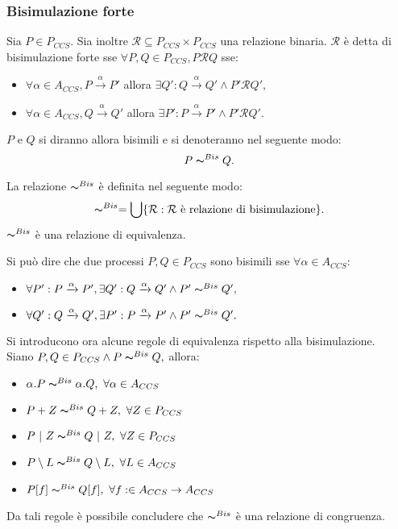\subsubsection{Bisimulazione forte}
\begin{deff}
	Sia $P \in P_{CCS}.$ Sia inoltre $\mathcal{R} \subseteq P_{CCS} \times P_{CCS} $ una relazione binaria. $\mathcal{R}$ \`e detta di bisimulazione forte sse $ \forall P, Q \in P_{CCS}, P\mathcal{R}Q$ sse:
	\begin{itemize}
		\item $ \forall \alpha \in A_{CCS}, P \xrightarrow{\alpha} P'$ allora $\exists Q' : Q \xrightarrow{\alpha} Q' \land P'\mathcal{R}Q',$
		\item $ \forall \alpha \in A_{CCS}, Q \xrightarrow{\alpha} Q'$ allora $\exists P' : P \xrightarrow{\alpha} P' \land P'\mathcal{R}Q'.$
	\end{itemize}
$P$ e $Q$ si diranno allora bisimili e si denoteranno nel seguente modo: $$P \thicksim^{Bis} Q.$$
\end{deff}
\begin{deff}
	La relazione $\thicksim^{Bis}$ \`e definita nel seguente modo: $$ \thicksim^{Bis} = \bigcup \{\mathcal{R}: \mathcal{R} \text{ \`e relazione di bisimulazione} \}.$$ $\thicksim^{Bis} $ \`e una relazione di equivalenza.
\end{deff}
Si pu\`o dire che due processi $P, Q \in P_{CCS} $ sono bisimili sse $\forall \alpha \in A_{CCS}:$
\begin{itemize}
	\item $\forall P': P \xrightarrow{\alpha}P', \exists Q': Q \xrightarrow{\alpha} Q' \land P' \thicksim^{Bis} Q',$
	\item $\forall Q': Q \xrightarrow{\alpha}Q', \exists P': P \xrightarrow{\alpha} P' \land P' \thicksim^{Bis} Q'.$
\end{itemize}
Si introducono ora alcune regole di equivalenza rispetto alla bisimulazione. \\
Siano $P, Q \in P_{CCS} \land P \thicksim^{Bis} Q,$ allora:
\begin{itemize}
	\item $\alpha.P \thicksim^{Bis} \alpha.Q,\ \forall \alpha \in A_{CCS}$
	\item $P + Z \thicksim^{Bis} Q + Z,\ \forall Z \in P_{CCS}$
	\item $P\ |\ Z \thicksim^{Bis} Q\ |\ Z,\ \forall Z \in P_{CCS}$
	\item $P \setminus L \thicksim^{Bis} Q \setminus L,\ \forall L \in A_{CCS}$
	\item $P[f] \thicksim^{Bis} Q[f],\ \forall f: \in A_{CCS} \rightarrow A_{CCS}$
\end{itemize}
Da tali regole \`e possibile concludere che $\thicksim^{Bis}$ \`e una relazione di congruenza.

